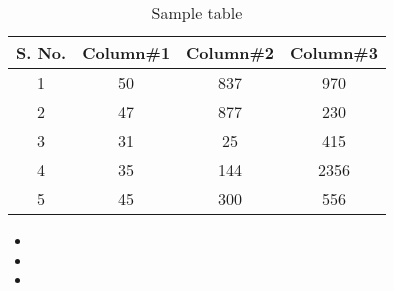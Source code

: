 \documentclass[a4paper,11pt]{book}
\begin{document}
\section{}
\begin{table}[ht]
\caption{Sample table} %
\centering %
\begin{tabular}{c c c c}
\hline\hline %
S. No. & Column\#1 & Column\#2 & Column\#3 \\ [0.5ex]
\hline %
1 & 50 & 837 & 970 \\
2 & 47 & 877 & 230 \\
3 & 31 & 25 & 415 \\
4 & 35 & 144 & 2356 \\
5 & 45 & 300 & 556 \\ [1ex] %
\hline %
\end{tabular}
\label{table:nonlin} %
\end{table}
\begin{itemize}
\item 
\item 
\item
\end{itemize}

\subsection{}

\subsection{}
\end{document}
